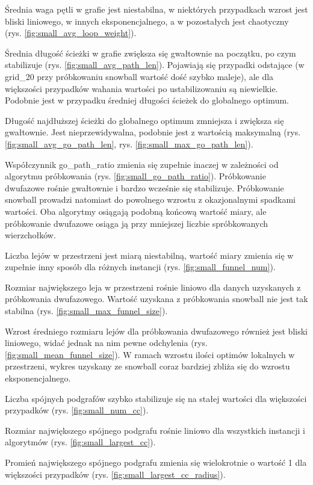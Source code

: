 Średnia waga pętli w grafie jest niestabilna, w niektórych przypadkach wzrost jest bliski liniowego, w innych
eksponencjalnego, a w pozostałych jest chaotyczny (rys. \ref{fig:small_avg_loop_weight}).

Średnia długość ścieżki w grafie zwiększa się gwałtownie na początku, po czym stabilizuje (rys. \ref{fig:small_avg_path_len}).
Pojawiają się przypadki odstające (w grid\_20 przy próbkowaniu snowball wartość dość szybko maleje),
ale dla większości przypadków wahania wartości po ustabilizowaniu są niewielkie.
Podobnie jest w przypadku średniej długości ścieżek do globalnego optimum.

Długość najdłuższej ścieżki do globalnego optimum zmniejsza i zwiększa się gwałtownie.
Jest nieprzewidywalna, podobnie jest z wartością maksymalną (rys. \ref{fig:small_avg_go_path_len}, rys. \ref{fig:small_max_go_path_len}).

Współczynnik go\_path\_ratio zmienia się zupełnie inaczej w zależności od algorytmu próbkowania (rys. \ref{fig:small_go_path_ratio}).
Próbkowanie dwufazowe rośnie gwałtownie i bardzo wcześnie się stabilizuje.
Próbkowanie snowball prowadzi natomiast do powolnego wzrostu z okazjonalnymi spadkami wartości.
Oba algorytmy osiągają podobną końcową wartość miary, ale próbkowanie dwufazowe osiąga ją przy mniejszej
liczbie spróbkowanych wierzchołków.

Liczba lejów w przestrzeni jest miarą niestabilną, wartość miary zmienia się w zupełnie inny sposób
dla różnych instancji (rys. \ref{fig:small_funnel_num}).

Rozmiar największego leja w przestrzeni rośnie liniowo dla danych uzyskanych z próbkowania
dwufazowego. Wartość uzyskana z próbkowania snowball nie jest tak stabilna (rys. \ref{fig:small_max_funnel_size}).

Wzrost średniego rozmiaru lejów dla próbkowania dwufazowego również jest bliski liniowego,
widać jednak na nim pewne odchylenia (rys. \ref{fig:small_mean_funnel_size}). W ramach wzrostu ilości optimów lokalnych w przestrzeni,
wykres uzyskany ze snowball coraz bardziej zbliża się do wzrostu eksponencjalnego.

Liczba spójnych podgrafów szybko stabilizuje się na stałej wartości dla większości przypadków (rys. \ref{fig:small_num_cc}).

Rozmiar największego spójnego podgrafu rośnie liniowo dla wszystkich instancji i algorytmów (rys. \ref{fig:small_largest_cc}).

Promień największego spójnego podgrafu zmienia się wielokrotnie o wartość 1 dla większości przypadków (rys. \ref{fig:small_largest_cc_radius}).

